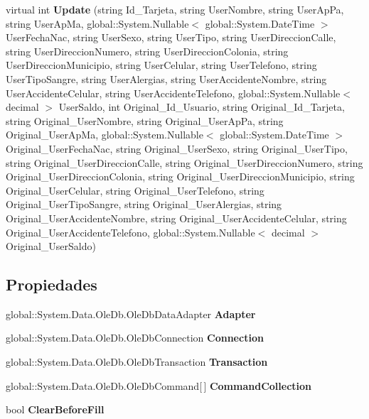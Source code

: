 \begin{DoxyCompactItemize}
\item 
virtual int {\bf Update} (string Id\-\_\-\-Tarjeta, string User\-Nombre, string User\-Ap\-Pa, string User\-Ap\-Ma, global\-::\-System.\-Nullable$<$ global\-::\-System.\-Date\-Time $>$ User\-Fecha\-Nac, string User\-Sexo, string User\-Tipo, string User\-Direccion\-Calle, string User\-Direccion\-Numero, string User\-Direccion\-Colonia, string User\-Direccion\-Municipio, string User\-Celular, string User\-Telefono, string User\-Tipo\-Sangre, string User\-Alergias, string User\-Accidente\-Nombre, string User\-Accidente\-Celular, string User\-Accidente\-Telefono, global\-::\-System.\-Nullable$<$ decimal $>$ User\-Saldo, int Original\-\_\-\-Id\-\_\-\-Usuario, string Original\-\_\-\-Id\-\_\-\-Tarjeta, string Original\-\_\-\-User\-Nombre, string Original\-\_\-\-User\-Ap\-Pa, string Original\-\_\-\-User\-Ap\-Ma, global\-::\-System.\-Nullable$<$ global\-::\-System.\-Date\-Time $>$ Original\-\_\-\-User\-Fecha\-Nac, string Original\-\_\-\-User\-Sexo, string Original\-\_\-\-User\-Tipo, string Original\-\_\-\-User\-Direccion\-Calle, string Original\-\_\-\-User\-Direccion\-Numero, string Original\-\_\-\-User\-Direccion\-Colonia, string Original\-\_\-\-User\-Direccion\-Municipio, string Original\-\_\-\-User\-Celular, string Original\-\_\-\-User\-Telefono, string Original\-\_\-\-User\-Tipo\-Sangre, string Original\-\_\-\-User\-Alergias, string Original\-\_\-\-User\-Accidente\-Nombre, string Original\-\_\-\-User\-Accidente\-Celular, string Original\-\_\-\-User\-Accidente\-Telefono, global\-::\-System.\-Nullable$<$ decimal $>$ Original\-\_\-\-User\-Saldo)
\end{DoxyCompactItemize}
\subsection*{Propiedades}
\begin{DoxyCompactItemize}
\item 
global\-::\-System.\-Data.\-Ole\-Db.\-Ole\-Db\-Data\-Adapter {\bf Adapter}\hspace{0.3cm}{\ttfamily  [get]}
\item 
global\-::\-System.\-Data.\-Ole\-Db.\-Ole\-Db\-Connection {\bf Connection}\hspace{0.3cm}{\ttfamily  [get, set]}
\item 
global\-::\-System.\-Data.\-Ole\-Db.\-Ole\-Db\-Transaction {\bf Transaction}\hspace{0.3cm}{\ttfamily  [get, set]}
\item 
global\-::\-System.\-Data.\-Ole\-Db.\-Ole\-Db\-Command[$\,$] {\bf Command\-Collection}\hspace{0.3cm}{\ttfamily  [get]}
\item 
bool {\bf Clear\-Before\-Fill}\hspace{0.3cm}{\ttfamily  [get, set]}
\end{DoxyCompactItemize}
